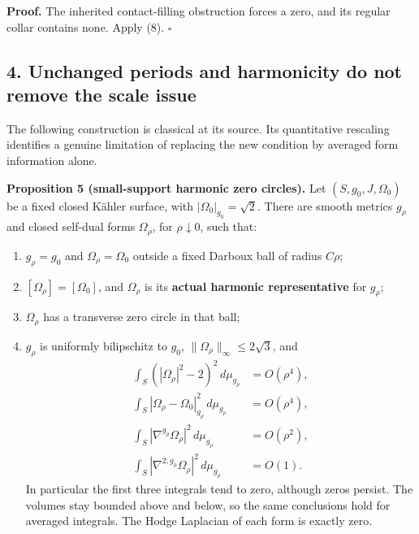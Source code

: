 \documentclass[
  11pt,
]{article}
\providecommand{\tightlist}{%
  \setlength{\itemsep}{0pt}\setlength{\parskip}{0pt}}
\begin{document}
\textbf{Proof.} The inherited contact-filling obstruction forces a zero,
and its regular collar contains none. Apply (8). \(\square\)

\hypertarget{unchanged-periods-and-harmonicity-do-not-remove-the-scale-issue}{%
\subsection{4. Unchanged periods and harmonicity do not remove the scale
issue}\label{unchanged-periods-and-harmonicity-do-not-remove-the-scale-issue}}

The following construction is classical at its source. Its quantitative
rescaling identifies a genuine limitation of replacing the new condition
by averaged form information alone.

\textbf{Proposition 5 (small-support harmonic zero circles).} Let
\((S,g_0,J,\Omega_0)\) be a fixed closed Kähler surface, with
\(|\Omega_0|_{g_0}=\sqrt2\). There are smooth metrics \(g_\rho\) and
closed self-dual forms \(\Omega_\rho\), for \(\rho\downarrow0\), such
that:

\begin{enumerate}
\def\labelenumi{\arabic{enumi}.}
\tightlist
\item
  \(g_\rho=g_0\) and \(\Omega_\rho=\Omega_0\) outside a fixed Darboux
  ball of radius \(C\rho\);
\item
  \([\Omega_\rho]=[\Omega_0]\), and \(\Omega_\rho\) is its
  \textbf{actual harmonic representative} for \(g_\rho\);
\item
  \(\Omega_\rho\) has a transverse zero circle in that ball;
\item
  \(g_\rho\) is uniformly bilipschitz to \(g_0\),
  \(\|\Omega_\rho\|_\infty\le2\sqrt3\), and \[
   \begin{split}
   \int_S(|\Omega_\rho|^2-2)^2\,d\mu_{g_\rho}&=O(\rho^4),\\
   \int_S|\Omega_\rho-\Omega_0|_{g_\rho}^2\,d\mu_{g_\rho}
                                                   &=O(\rho^4),\\
   \int_S|\nabla^{g_\rho}\Omega_\rho|^2\,d\mu_{g_\rho}
                                                   &=O(\rho^2),\\
   \int_S|\nabla^{2,g_\rho}\Omega_\rho|^2\,d\mu_{g_\rho}
                                                   &=O(1).
   \end{split}                                                   \tag{12}
  \] In particular the first three integrals tend to zero, although
  zeros persist. The volumes stay bounded above and below, so the same
  conclusions hold for averaged integrals. The Hodge Laplacian of each
  form is exactly zero.
\end{enumerate}
\end{document}
